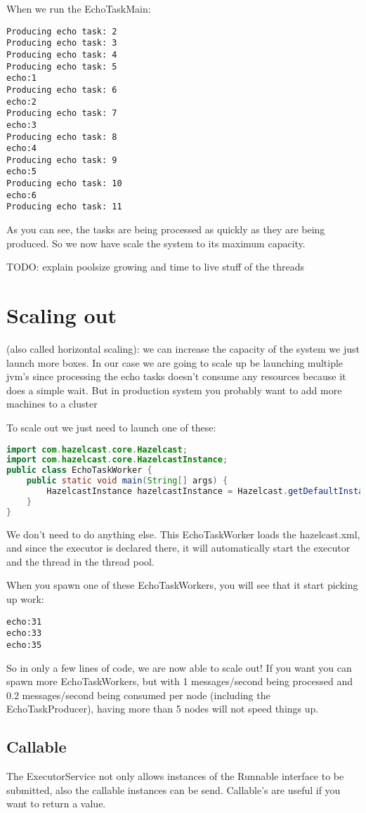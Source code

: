 When we run the EchoTaskMain:
\begin{verbatim}
Producing echo task: 2
Producing echo task: 3
Producing echo task: 4
Producing echo task: 5
echo:1
Producing echo task: 6
echo:2
Producing echo task: 7
echo:3
Producing echo task: 8
echo:4
Producing echo task: 9
echo:5
Producing echo task: 10
echo:6
Producing echo task: 11	
\end{verbatim}
As you can see, the tasks are being processed as quickly as they are being produced. So we now have scale the system to its maximum capacity.

TODO: explain poolsize growing and time to live stuff of the threads

\section{Scaling out}
(also called horizontal scaling): we can increase the capacity of the system we just launch more boxes. In our case we are going to scale up be launching multiple jvm's since processing the echo tasks doesn't consume any resources because it does a simple wait. But in production system you probably want to add more machines to a cluster

To scale out we just need to launch one of these:

\begin{lstlisting}[language=java]
import com.hazelcast.core.Hazelcast;
import com.hazelcast.core.HazelcastInstance;
public class EchoTaskWorker {
    public static void main(String[] args) {
        HazelcastInstance hazelcastInstance = Hazelcast.getDefaultInstance();
    }
}
\end{lstlisting}
We don't need to do anything else. This EchoTaskWorker loads the hazelcast.xml, and since the executor is declared there, it will automatically start the executor and the thread in the thread pool. 


When you spawn one of these EchoTaskWorkers, you will see that it start picking up work:
\begin{verbatim}
echo:31
echo:33
echo:35	
\end{verbatim}
So in only a few lines of code, we are now able to scale out! If you want you can spawn more EchoTaskWorkers, but with 1 messages/second being processed and 0.2 messages/second being consumed per node (including the EchoTaskProducer), having more than 5 nodes will not speed things up.

\subsection{Callable}
The ExecutorService not only allows instances of the Runnable interface to be submitted, also the callable instances can be send. Callable's are useful if you want to return a value.

